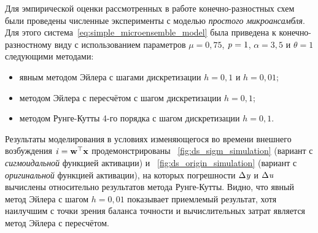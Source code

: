 Для эмпирической оценки рассмотренных в работе конечно-разностных схем были проведены численные эксперименты с моделью \textit{простого микроансамбля}. Для этого система~\eqref{eq:simple_microensemble_model} была приведена к конечно-разностному виду с использованием параметров $\mu = 0,75$, $\mathit{p} = 1$, $\alpha = 3,5$ и $\theta = 1$ следующими методами:
\begin{itemize}
    \item явным методом Эйлера с шагами дискретизации $h=0,1$ и $h=0,01$;
    \item методом Эйлера с пересчётом с шагом дискретизации $h=0,1$;
    \item методом Рунге-Кутты 4-го порядка с шагом дискретизации $h=0,1$.
\end{itemize}

Результаты моделирования в условиях изменяющегося во времени внешнего возбуждения $\mathit{i} = \mathrm{\mathbf{w}}^{\top} \mathrm{\mathbf{x}}$ продемонстрированы \onfigure~\ref{fig:ds_sigm_simulation} (вариант с \textit{сигмоидальной} функцией активации) и \onfigure~\ref{fig:ds_origin_simulation} (вариант с \textit{оригинальной} функцией активации), на которых погрешности $\Delta\mathit{y}$ и $\Delta\mathit{u}$ вычислены относительно результатов метода Рунге-Кутты. Видно, что явный метод Эйлера с шагом $h=0,01$ показывает приемлемый результат, хотя наилучшим с точки зрения баланса точности и вычислительных затрат является метод Эйлера с пересчётом.



